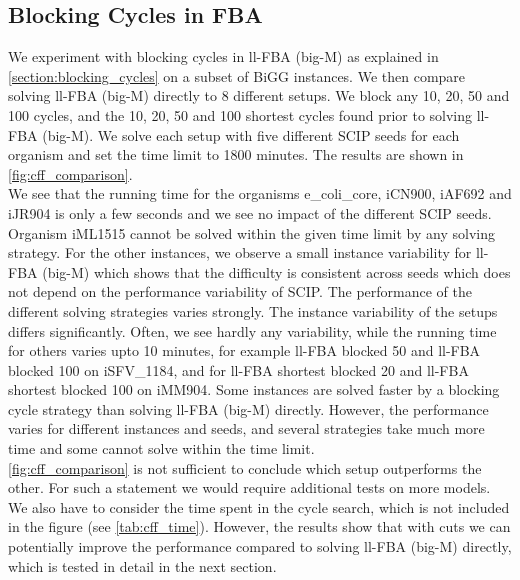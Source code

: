 \subsection{Blocking Cycles in FBA} \label{section:results_blocking_cycles}
We experiment with blocking cycles in \textsf{ll-FBA (big-M)} as explained in \cref{section:blocking_cycles} on a subset of BiGG instances.
We then compare solving \textsf{ll-FBA (big-M)} directly to 8 different setups. We block any 10, 20, 50 and 100 cycles, and the 10, 20, 50 and 100 shortest cycles found prior to solving \textsf{ll-FBA (big-M)}. 
We solve each setup with five different \textsf{SCIP} seeds for each organism and set the time limit to 1800 minutes. The results are shown in \cref{fig:cff_comparison}.\\
We see that the running time for the organisms \textsf{e\_coli\_core}, \textsf{iCN900}, \textsf{iAF692} and \textsf{iJR904} is only a few seconds and we see no impact of the different \textsf{SCIP} seeds. Organism \textsf{iML1515} cannot be solved within the given time limit by any solving strategy. For the other instances, we observe a small instance variability for \textsf{ll-FBA (big-M)} which shows that the difficulty is consistent across seeds which does not depend on the performance variability of \textsf{SCIP}. The performance of the different solving strategies varies strongly. 
The instance variability of the setups differs significantly. Often, we see hardly any variability, while the running time for others varies upto 10 minutes, for example \textsf{ll-FBA blocked 50} and \textsf{ll-FBA blocked 100} on \textsf{iSFV\_1184}, and for \textsf{ll-FBA shortest blocked 20} and \textsf{ll-FBA shortest blocked 100} on \textsf{iMM904}. Some instances are solved faster by a blocking cycle strategy than solving \textsf{ll-FBA (big-M)} directly. However, the performance varies for different instances and seeds, and several strategies take much more time and some cannot solve within the time limit.\\
\cref{fig:cff_comparison} is not sufficient to conclude which setup outperforms the other. For such a statement we would require additional tests on more models. 
We also have to consider the time spent in the cycle search, which is not included in the figure (see \cref{tab:cff_time}).
However, the results show that with cuts we can potentially improve the performance compared to solving \textsf{ll-FBA (big-M)} directly, which is tested in detail in the next section.

